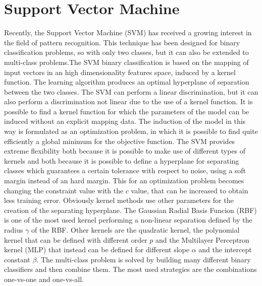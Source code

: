 \documentclass[final,a4paper,12pt,english]{UnicaPhdThesis3}
\begin{document}
\section{Support Vector Machine} \label{SVM}
Recently, the Support Vector Machine (\acs{SVM}) has received a growing interest in the field of pattern recognition. This technique has been designed for binary classification problems, so with only two classes, but it can also be extended to multi-class problems.The SVM binary classification is based on the mapping of input vectors in an high dimensionality features space, induced by a kernel function. The learning algorithm produces an optimal hyperplane of separation between the two classes. The SVM can perform a linear discrimination, but it can also perform a discrimination not linear due to the use of a kernel function. It is possible to find a kernel function for which the parameters of the model can be induced without an explicit mapping data. The induction of the model in this way is formulated as an optimization problem, in which it is possible to find quite efficiently a global minimum for the objective function. The SVM provides extreme flexibility both because it is possible to make use of different types of kernels and both because it is possible to define a hyperplane for separating classes which guarantees a certain tolerance with respect to noise, using a soft margin instead of an hard margin. This for an optimization problem becomes changing the constraint value with the $c$ value, that can be increased to obtain less training error. Obviously kernel methods use other parameters for the creation of the separating hyperplane. The Gaussian Radial Basis Funcion (\acs{RBF}) is one of the most used kernel performing a non-linear separation defined by the radius  $\gamma$ of the RBF. Other kernels are the quadratic kernel, the polynomial kernel that can be defined with different order $p$ and the Multilayer Perceptron kernel (MLP) that instead can be defined for different slope $\alpha$ and the intercept constant $\beta$. The multi-class problem is solved by building many different binary classifiers and then combine them. The most used strategies are the combinations one-vs-one and one-vs-all. 
\end{document}
